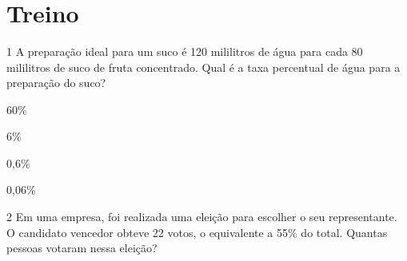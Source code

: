 \\
\\
\\





\section{Treino}

\num{1} A preparação ideal para um suco é 120 mililitros de água para cada 80
mililitros de suco de fruta concentrado. Qual é a taxa percentual de
água para a preparação do suco?

\begin{escolha}[itemsep=0pt]
\item 60\%
\item 6\%
\item 0,6\%
\item 0,06\%
\end{escolha}












\num{2} Em uma empresa, foi realizada uma eleição para escolher o seu
representante. O candidato vencedor obteve 22 votos, o equivalente a
55\% do total. Quantas pessoas votaram nessa eleição?

